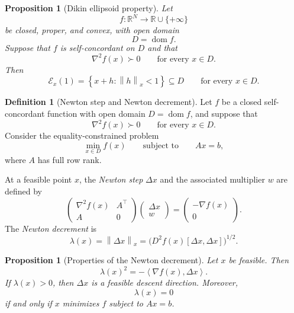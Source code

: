 \documentclass[a4paper,11pt]{book}
\theoremstyle{plain}
\newtheorem{proposition}[theorem]{Proposition}
\theoremstyle{definition}
\newtheorem{definition}[theorem]{Definition}
\theoremstyle{remark}
\numberwithin{equation}{chapter}
\numberwithin{algorithm}{chapter}
\newcommand{\R}{\mathbb{R}}
\newcommand{\norm}[1]{\left\|#1\right\|}
\newcommand{\inner}[2]{\left\langle #1, #2 \right\rangle}
\newcommand{\dom}{\operatorname{dom}}
\begin{document}
	\begin{proposition}[Dikin ellipsoid property]
		Let
		\[
		f:\R^N\to\R\cup\{+\infty\}
		\]
		be closed, proper, and convex, with open domain
		\[
		D=\dom f.
		\]
		Suppose that \(f\) is self-concordant on \(D\) and that
		\[
		\nabla^2f(x)\succ0
		\qquad
		\text{for every }x\in D.
		\]
		Then
		\begin{equation}
			\mathcal E_x(1)
			=
			\left\{
			x+h:\norm{h}_x<1
			\right\}
			\subseteq D
			\qquad
			\text{for every }x\in D.
		\end{equation}
	\end{proposition}
	
	\begin{definition}[Newton step and Newton decrement]
		Let \(f\) be a closed self-concordant function with open domain
		\(D=\dom f\), and suppose that
		\[
		\nabla^2f(x)\succ0
		\qquad
		\text{for every }x\in D.
		\]
		Consider the equality-constrained problem
		\[
		\min_{x\in D}f(x)
		\qquad
		\text{subject to}
		\qquad
		Ax=b,
		\]
		where \(A\) has full row rank.
		
		At a feasible point \(x\), the \emph{Newton step} \(\Delta x\) and the
		associated multiplier \(w\) are defined by
		\begin{equation}
			\begin{pmatrix}
				\nabla^2f(x) & A^\top\\
				A            & 0
			\end{pmatrix}
			\begin{pmatrix}
				\Delta x\\
				w
			\end{pmatrix}
			=
			\begin{pmatrix}
				-\nabla f(x)\\
				0
			\end{pmatrix}.
			\label{eq:constrained-newton-system}
		\end{equation}
		The \emph{Newton decrement} is
		\begin{equation}
			\lambda(x)
			=
			\norm{\Delta x}_x
			=
			\bigl(
			D^2f(x)[\Delta x,\Delta x]
			\bigr)^{1/2}.
		\end{equation}
	\end{definition}
	
	\begin{proposition}[Properties of the Newton decrement]
		Let \(x\) be feasible. Then
		\begin{equation}
			\lambda(x)^2
			=
			-\inner{\nabla f(x)}{\Delta x}.
			\label{eq:newton-decrement-descent}
		\end{equation}
		If \(\lambda(x)>0\), then \(\Delta x\) is a feasible descent direction.
		Moreover,
		\[
		\lambda(x)=0
		\]
		if and only if \(x\) minimizes \(f\) subject to \(Ax=b\).
	\end{proposition}
	
\end{document}
